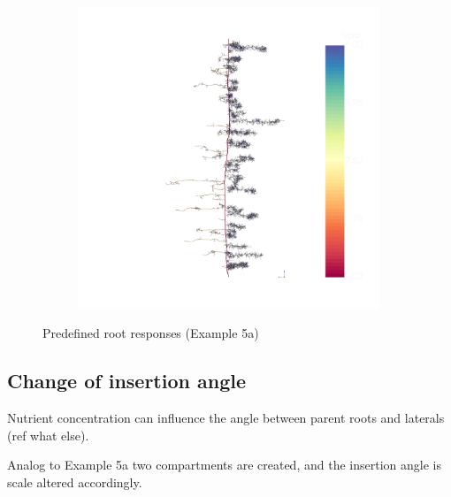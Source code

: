 \begin{figure}
\begin{subfigure}[c]{0.32\textwidth}
 \label{fig:insertion}
\end{subfigure}
\begin{subfigure}[c]{0.32\textwidth}
\includegraphics[width=0.99\textwidth]{example5d.png}
 \label{fig:probability}
\end{subfigure}
\caption{Predefined root responses (Example 5a)}
\end{figure}



\subsection{Change of insertion angle} \label{sec:insertion_angle}

Nutrient concentration can influence the angle between parent roots and laterals (ref what else).

Analog to Example 5a two compartments are created, and the insertion angle is scale altered accordingly.



